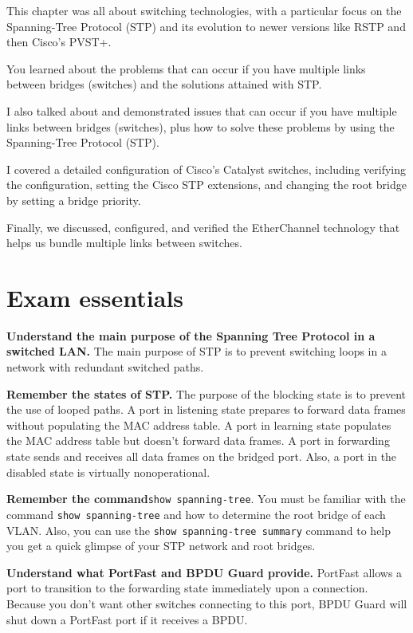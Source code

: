 \documentclass[b5paper,11pt]{memoir}
\begin{document}
This chapter was all about switching technologies, with a particular focus on the Spanning-Tree Protocol (STP) and its evolution to newer
versions like RSTP and then Cisco's PVST+.

You learned about the problems that can occur if you have multiple links between bridges (switches) and the solutions attained with STP.

I also talked about and demonstrated issues that can occur if you have multiple links between bridges (switches), plus how to solve these
problems by using the Spanning-Tree Protocol (STP).

I covered a detailed configuration of Cisco's Catalyst switches, including verifying the configuration, setting the Cisco STP extensions,
and changing the root bridge by setting a bridge priority.

Finally, we discussed, configured, and verified the EtherChannel technology that helps us bundle multiple links between switches.




\section{Exam essentials}

\textbf{Understand the main purpose of the Spanning Tree Protocol in a
switched LAN.} The main purpose of STP is to prevent switching loops in
a network with redundant switched paths.

\textbf{Remember the states of STP.} The purpose of the blocking state
is to prevent the use of looped paths. A port in listening state
prepares to forward data frames without populating the MAC address
table. A port in learning state populates the MAC address table but
doesn't forward data frames. A port in forwarding state sends and
receives all data frames on the bridged port. Also, a port in the
disabled state is virtually nonoperational.

\textbf{Remember the command}\texttt{show\ spanning-tree}. You must be
familiar with the command \texttt{show\ spanning-tree} and how to
determine the root bridge of each VLAN. Also, you can use the
\texttt{show\ spanning-tree\ summary} command to help you get a quick
glimpse of your STP network and root bridges.

\textbf{Understand what PortFast and BPDU Guard provide.} PortFast
allows a port to transition to the forwarding state immediately upon a
connection. Because you don't want other switches connecting to this
port, BPDU Guard will shut down a PortFast port if it receives a BPDU.
\end{document}
